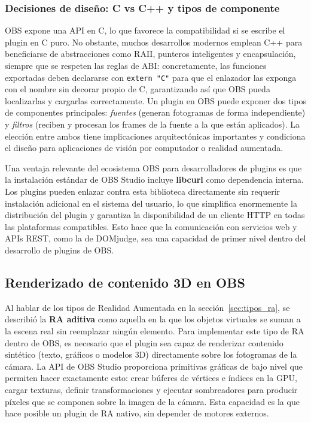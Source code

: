 \subsubsection*{Decisiones de diseño: C vs C++ y tipos de componente}
OBS expone una API en C, lo que favorece la compatibilidad si se escribe el plugin en C puro. No obstante, muchos desarrollos modernos emplean C++ para beneficiarse de abstracciones como RAII, punteros inteligentes y encapsulación, siempre que se respeten las reglas de ABI: concretamente, las funciones exportadas deben declararse con \verb|extern "C"| para que el enlazador las exponga con el nombre sin decorar propio de C, garantizando así que OBS pueda localizarlas y cargarlas correctamente. Un plugin en OBS puede exponer dos tipos de componentes principales: \emph{fuentes} (generan fotogramas de forma independiente) y \emph{filtros} (reciben y procesan los frames de la fuente a la que están aplicados). La elección entre ambos tiene implicaciones arquitectónicas importantes y condiciona el diseño para aplicaciones de visión por computador o realidad aumentada.

Una ventaja relevante del ecosistema OBS para desarrolladores de plugins es que la instalación estándar de OBS Studio incluye \textbf{libcurl} como dependencia interna. Los plugins pueden enlazar contra esta biblioteca directamente sin requerir instalación adicional en el sistema del usuario, lo que simplifica enormemente la distribución del plugin y garantiza la disponibilidad de un cliente HTTP en todas las plataformas compatibles. Esto hace que la comunicación con servicios web y APIs REST, como la de DOMjudge, sea una capacidad de primer nivel dentro del desarrollo de plugins de OBS.

\subsection{Renderizado de contenido 3D en OBS}
\label{subsec:modelos_3d}

Al hablar de los tipos de Realidad Aumentada en la sección~\ref{sec:tipos_ra}, se describió la \textbf{RA aditiva} como aquella en la que los objetos virtuales se suman a la escena real sin reemplazar ningún elemento. Para implementar este tipo de RA dentro de OBS, es necesario que el plugin sea capaz de renderizar contenido sintético (texto, gráficos o modelos 3D) directamente sobre los fotogramas de la cámara. La API de OBS Studio proporciona primitivas gráficas de bajo nivel que permiten hacer exactamente esto: crear búferes de vértices e índices en la GPU, cargar texturas, definir transformaciones y ejecutar sombreadores para producir píxeles que se componen sobre la imagen de la cámara. Esta capacidad es la que hace posible un plugin de RA nativo, sin depender de motores externos.

